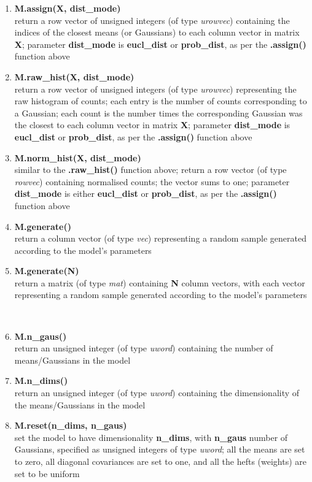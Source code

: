 \begin{enumerate}[{$\bullet$}]
\item
{\bf M.assign(X, dist\_mode)}\\
return a row vector of unsigned integers (of type {\it urowvec}) containing the indices of the closest means (or Gaussians) to each column vector in matrix {\bf X};
parameter {\bf dist\_mode} is {\bf eucl\_dist} or {\bf prob\_dist}, as per the {\bf .assign()} function above

\item
{\bf M.raw\_hist(X, dist\_mode)}\\
return a row vector of unsigned integers (of type {\it urowvec}) representing the raw histogram of counts;
each entry is the number of counts corresponding to a Gaussian;
each count is the number times the corresponding Gaussian was the closest to each column vector in matrix {\bf X};
parameter {\bf dist\_mode} is {\bf eucl\_dist} or {\bf prob\_dist}, as per the {\bf .assign()} function above

\item
{\bf M.norm\_hist(X, dist\_mode)}\\
similar to the {\bf .raw\_hist()} function above; return a row vector (of type {\it rowvec}) containing normalised counts; the vector sums to one;
parameter {\bf dist\_mode} is either {\bf eucl\_dist} or {\bf prob\_dist}, as per the {\bf .assign()} function above

\item
{\bf M.generate()}\\
return a column vector (of type {\it vec}) representing a random sample generated according to the model's parameters

\item
{\bf M.generate(N)}\\
return a matrix (of type {\it mat}) containing {\bf N} column vectors, with each vector representing a random sample generated according to the model's parameters

~\\
\item
{\bf M.n\_gaus()}\\
return an unsigned integer (of type {\it uword}) containing the number of means/Gaussians in the model

\item
{\bf M.n\_dims()}\\
return an unsigned integer (of type {\it uword}) containing the dimensionality of the means/Gaussians in the model

\item
{\bf M.reset(n\_dims, n\_gaus)}\\
set the model to have dimensionality {\bf n\_dims}, with {\bf n\_gaus} number of Gaussians, specified as unsigned integers of type {\it uword};
all the means are set to zero, all diagonal covariances are set to one, and all the hefts (weights) are set to be uniform


\end{enumerate}
